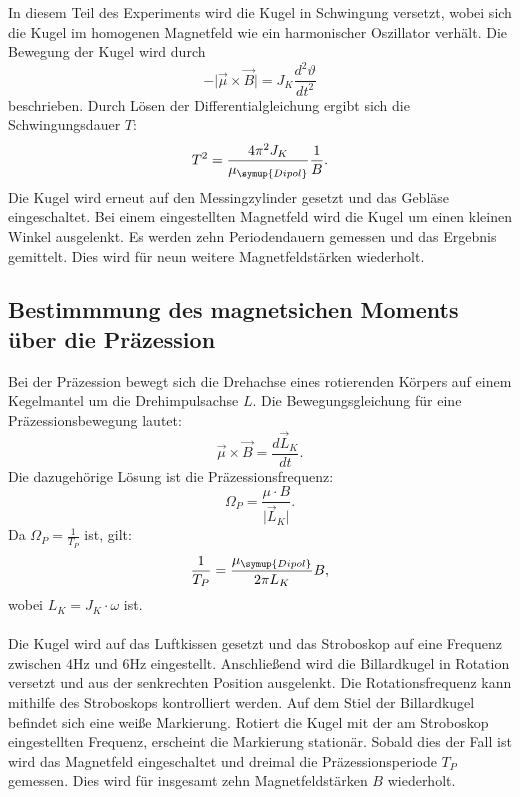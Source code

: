 In diesem Teil des Experiments wird die Kugel in Schwingung versetzt, wobei sich die Kugel im
homogenen Magnetfeld wie ein harmonischer Oszillator verhält.
Die Bewegung der Kugel wird durch
\begin{equation}
  - \lvert \vec{\mu} \times \vec{B} \rvert = J_K \frac{d^2 \vartheta}{dt^2}
\end{equation}
beschrieben.
Durch Lösen der Differentialgleichung ergibt sich die Schwingungsdauer $T$:
\begin{equation}
  T^2 = \frac{4 \pi^2 J_K}{\mu_\symup{Dipol}}\frac{1}{B}.
  \label{eqn:sdauer}
\end{equation}
Die Kugel wird erneut auf den Messingzylinder gesetzt und das Gebläse eingeschaltet.
Bei einem eingestellten Magnetfeld wird die Kugel um einen kleinen Winkel ausgelenkt.
Es werden zehn Periodendauern gemessen und das Ergebnis gemittelt.
Dies wird für neun weitere Magnetfeldstärken wiederholt.

\subsection{Bestimmmung des magnetsichen Moments über die Präzession \label{sec:prae}}

Bei der Präzession bewegt sich die Drehachse eines rotierenden Körpers auf einem Kegelmantel
um die Drehimpulsachse $L$.
Die Bewegungsgleichung für eine Präzessionsbewegung lautet:
\begin{equation}
  \vec{\mu} \times \vec{B} = \frac{d \vec{L}_K}{dt}.
\end{equation}
Die dazugehörige Lösung ist die Präzessionsfrequenz:
\begin{equation}
  \Omega_P = \frac{\mu \cdot B}{\lvert \vec{L}_K \rvert}.
\end{equation}
Da $\Omega_P = \frac{1}{T_P}$ ist, gilt:
\begin{equation}
  \frac{1}{T_P} = \frac{\mu_{\symup{Dipol}}}{2 \pi L_K} B,
  \label{eqn:pfrq}
\end{equation}
wobei $L_K = J_K \cdot \omega$ ist.
\\
\\
Die Kugel wird auf das Luftkissen gesetzt und das Stroboskop auf eine
Frequenz zwischen $4 \mathrm{Hz}$ und $6 \mathrm{Hz}$ eingestellt.
Anschließend wird die Billardkugel in Rotation versetzt und aus der senkrechten Position ausgelenkt.
Die Rotationsfrequenz kann mithilfe des Stroboskops kontrolliert werden.
Auf dem Stiel der Billardkugel befindet sich eine weiße Markierung.
Rotiert die Kugel mit der am Stroboskop eingestellten Frequenz, erscheint die Markierung stationär.
Sobald dies der Fall ist wird das Magnetfeld eingeschaltet und dreimal die Präzessionsperiode $T_P$ gemessen.
Dies wird für insgesamt zehn Magnetfeldstärken $B$ wiederholt.
